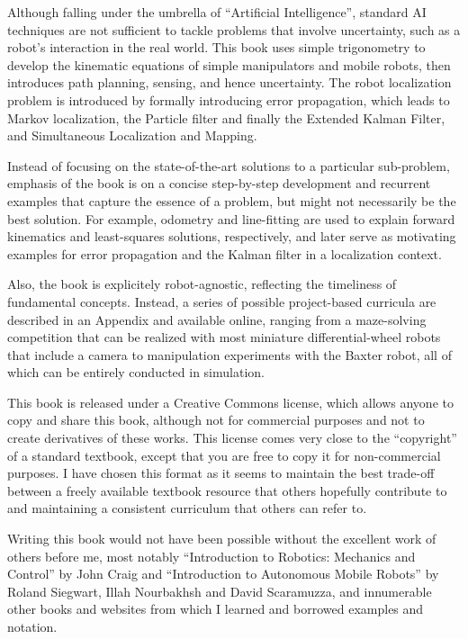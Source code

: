 \documentclass[paper=6.14in:9.21in,pagesize=pdftex,11pt,twoside,openright]{scrbook}
\begin{document}
Although falling under the umbrella of ``Artificial Intelligence'', standard AI techniques are not sufficient to tackle problems that involve uncertainty, such as a robot's interaction in the real world. This book uses simple trigonometry to develop the kinematic equations of simple manipulators and mobile robots, then introduces path planning, sensing, and hence uncertainty. The robot localization problem is introduced by formally introducing error propagation, which leads to Markov localization, the Particle filter and finally the Extended Kalman Filter, and Simultaneous Localization and Mapping. 

Instead of focusing on the state-of-the-art solutions to a particular sub-problem, emphasis of the book is on a concise step-by-step development and recurrent examples that capture the essence of a problem, but might not necessarily be the best solution. For example, odometry and line-fitting are used to explain forward kinematics and least-squares solutions, respectively, and later serve as motivating examples for error propagation and the Kalman filter in a localization context.

Also, the book is explicitely robot-agnostic, reflecting the timeliness of fundamental concepts. Instead, a series of possible project-based curricula are described in an Appendix and available online, ranging from a maze-solving competition that can be realized with most miniature differential-wheel robots that include a camera to manipulation experiments with the Baxter robot, all of which can be entirely conducted in simulation. 

This book is released under a Creative Commons license, which allows anyone to copy and share this book, although not for commercial purposes and not to create derivatives of these works. This license comes very close to the ``copyright'' of a standard textbook, except that you are free to copy it for non-commercial purposes. I have chosen this format as it seems to maintain the best trade-off between a freely available textbook resource that others hopefully contribute to and maintaining a consistent curriculum that others can refer to. 

Writing this book would not have been possible without the excellent work of others before me, most notably ``Introduction to Robotics: Mechanics and Control'' by John Craig and ``Introduction to Autonomous Mobile Robots'' by Roland Siegwart, Illah Nourbakhsh and David Scaramuzza, and innumerable other books and websites from which I learned and borrowed examples and notation.
\end{document}
